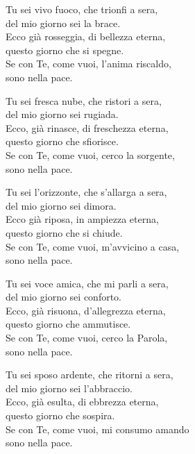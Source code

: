 
\strofa Tu sei vivo fuoco, che trionfi a sera,\\
del mio giorno sei la brace.\\
Ecco già rosseggia, di bellezza eterna,\\
questo giorno che si spegne.\\
Se con Te, come vuoi, l'anima riscaldo,\\
sono nella pace.

\spazio

\strofa Tu sei fresca nube, che ristori a sera,\\
del mio giorno sei rugiada.\\
Ecco, già rinasce, di freschezza eterna,\\
questo giorno che sfiorisce.\\
Se con Te, come vuoi, cerco la sorgente,\\
sono nella pace.

\spazio

\strofa Tu sei l'orizzonte, che s'allarga a sera,\\
del mio giorno sei dimora.\\
Ecco già riposa, in ampiezza eterna,\\
questo giorno che si chiude.\\
Se con Te, come vuoi, m'avvicino a casa,\\
sono nella pace.

\spazio

\strofa Tu sei voce amica, che mi parli a sera,\\
del mio giorno sei conforto.\\
Ecco, già risuona, d'allegrezza eterna,\\
questo giorno che ammutisce.\\
Se con Te, come vuoi, cerco la Parola,\\
sono nella pace.

\spazio

\strofa Tu sei sposo ardente, che ritorni a sera,\\
del mio giorno sei l'abbraccio.\\
Ecco, già esulta, di ebbrezza eterna,\\
questo giorno che sospira.\\
Se con Te, come vuoi, mi consumo amando\\
sono nella pace.